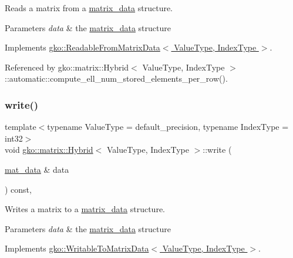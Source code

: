 Reads a matrix from a \hyperlink{structgko_1_1matrix__data}{matrix\+\_\+data} structure. 


\begin{DoxyParams}{Parameters}
{\em data} & the \hyperlink{structgko_1_1matrix__data}{matrix\+\_\+data} structure \\
\hline
\end{DoxyParams}


Implements \hyperlink{classgko_1_1ReadableFromMatrixData_add5c12e23b3ac3c8fbd607fa5a9656bb}{gko\+::\+Readable\+From\+Matrix\+Data$<$ Value\+Type, Index\+Type $>$}.



Referenced by gko\+::matrix\+::\+Hybrid$<$ Value\+Type, Index\+Type $>$\+::automatic\+::compute\+\_\+ell\+\_\+num\+\_\+stored\+\_\+elements\+\_\+per\+\_\+row().

\mbox{\label{classgko_1_1matrix_1_1Hybrid_a626c07541641bcdfd9a7f61322a89cbe}} 
\subsubsection{\texorpdfstring{write()}{write()}}
{\footnotesize\ttfamily template$<$typename Value\+Type = default\+\_\+precision, typename Index\+Type = int32$>$ \\
void \hyperlink{classgko_1_1matrix_1_1Hybrid}{gko\+::matrix\+::\+Hybrid}$<$ Value\+Type, Index\+Type $>$\+::write (\begin{DoxyParamCaption}\item[{\hyperlink{structgko_1_1matrix__data}{mat\+\_\+data} \&}]{data }\end{DoxyParamCaption}) const\hspace{0.3cm}{\ttfamily [override]}, {\ttfamily [virtual]}}



Writes a matrix to a \hyperlink{structgko_1_1matrix__data}{matrix\+\_\+data} structure. 


\begin{DoxyParams}{Parameters}
{\em data} & the \hyperlink{structgko_1_1matrix__data}{matrix\+\_\+data} structure \\
\hline
\end{DoxyParams}


Implements \hyperlink{classgko_1_1WritableToMatrixData_a96036c3a4bf4c67fa93002808b8b14e2}{gko\+::\+Writable\+To\+Matrix\+Data$<$ Value\+Type, Index\+Type $>$}.



